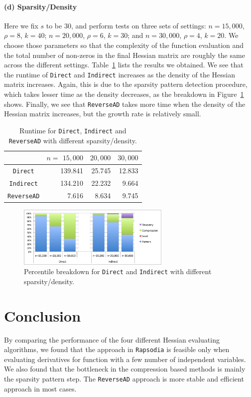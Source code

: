 \documentclass[final,leqno,onefignum,onetabnum]{siamart}
\begin{document}
\paragraph{(d) Sparsity/Density} 
Here we fix $s$ to be  $30$, and perform tests on three sets of settings: $n=15,000$, $\rho = 8$, $k=40$; $n=20,000$, $\rho=6$, $k=30$; and $n=30,000$, $\rho=4$, $k=20$. 
We choose those parameters so that the complexity of the function evaluation and the total number of non-zeros in the final Hessian matrix are roughly the same across the different settings. 
Table~\ref{tab:sparsity} lists the results we obtained.
We see that the runtime of {\tt Direct} and {\tt Indirect} increases as the density of the Hessian matrix increases. 
Again, this is due to the sparsity pattern detection procedure, which takes lesser time as the density decreases, as the breakdown in Figure~\ref{fig:sparsity-percentile} shows.
Finally, we see that {\tt ReverseAD} takes more time when the density of the Hessian matrix increases, but the growth rate is relatively small.
\begin{table}[htbp]
\begin{center}
\begin{tabular}{ | c | r | r | r |}
\hline
& $n=$ $15,000$ & $20,000$ & $30,000$\\
\hline
{\tt Direct} & 139.841 & 25.745 & 12.833\\
{\tt Indirect} & 134.210 & 22.232 & 9.664 \\
{\tt ReverseAD} & 7.616 & 8.634 & 9.745\\
\hline 
\end{tabular}
\caption{Runtime for {\tt Direct}, {\tt Indirect} and {\tt ReverseAD} with different sparsity/density.}
\label{tab:sparsity}
\end{center}
\end{table}

\begin{figure}[htbp]
        \centering
        \includegraphics[width=0.65\textwidth]{figures/pd}
        \caption{Percentile breakdown for {\tt Direct} and {\tt Indirect} with different sparsity/density.}
        \label{fig:sparsity-percentile}
\end{figure}

\section*{Conclusion}
By comparing the performance of the four different Hessian evaluating algorithms, we found that the approach in {\tt Rapsodia} is feasible only when evaluating derivatives for function with a few number of independent variables. We also found that the bottleneck in the compression based methods is mainly the sparsity pattern step. The {\tt ReverseAD} approach is more stable and efficient approach in most cases. 




\end{document}

